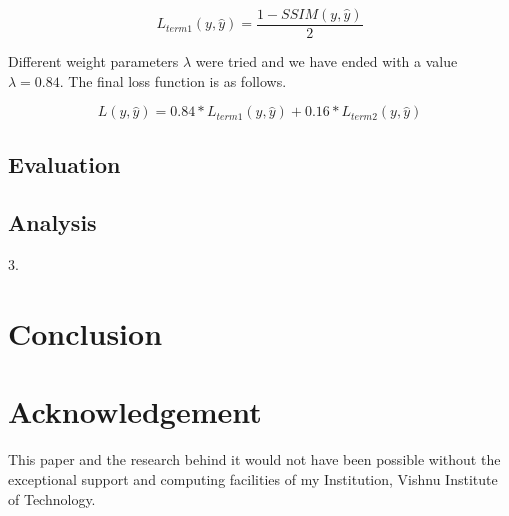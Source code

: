 \documentclass{article}
\begin{document}
\begin{equation}
L_{term1}(y, \hat{y}) = \frac{1 - SSIM(y, \hat{y})}{2}
\end{equation}

Different weight parameters $\lambda$ were tried and we have ended with a value $\lambda = 0.84$. The final loss function is as follows.

\begin{equation}
L(y, \hat{y}) = 0.84 \ast L_{term1}(y, \hat{y}) + 0.16 \ast L_{term2}(y, \hat{y})
\end{equation}

\subsection{Evaluation}
\subsection{Analysis}

3. 
\section{Conclusion}
\section{Acknowledgement}
This paper and the research behind it would not have been possible without the exceptional support and computing facilities of my Institution, Vishnu Institute of Technology.
\end{document}
